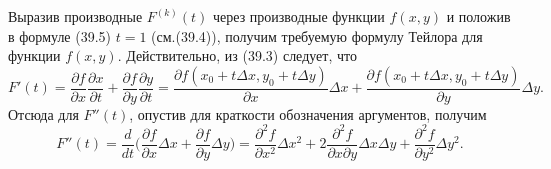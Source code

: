 \documentclass[a4paper]{article}
\begin{document}
Выразив производные $F^{(k)}(t)$ через производные функции $f(x,y)$ и положив в формуле (39.5) $t=1$ (см.(39.4)), получим требуемую формулу Тейлора для функции $f(x,y)$. Действительно, из (39.3) следует, что
\[F'(t) = \dfrac{\partial f}{\partial x}\dfrac{\partial x}{\partial t} + \dfrac{\partial f}{\partial y}\dfrac{\partial y}{\partial t} = \dfrac{\partial f(x_0 + t\Delta x, y_0 + t\Delta y)}{\partial x}\Delta x + \dfrac{\partial f(x_0 + t\Delta x, y_0 + t\Delta y)}{\partial y}\Delta y.\]
Отсюда для $F''(t)$, опустив для краткости обозначения аргументов, получим
\[F''(t) = \dfrac{d}{dt}\Big(\dfrac{\partial f}{\partial x}\Delta x + \dfrac{\partial f}{\partial y}\Delta y\Big) = \dfrac{\partial^2 f}{\partial x^2}\Delta x^2 + 2\dfrac{\partial^2 f}{\partial x\partial y}\Delta x\Delta y + \dfrac{\partial^2 f}{\partial y^2}\Delta y^2.\]
\end{document}
